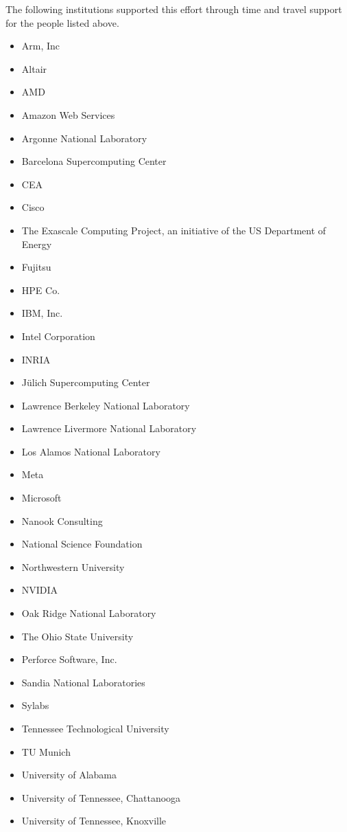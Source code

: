 The following institutions supported this effort through time and travel support for the people listed above.

\begin{itemize}
    \item Arm, Inc
    \item Altair
    \item AMD
    \item Amazon Web Services
    \item Argonne National Laboratory
    \item Barcelona Supercomputing Center
    \item CEA
    \item Cisco
    \item The Exascale Computing Project, an initiative of the US Department of Energy
    \item Fujitsu
    \item HPE Co.
    \item IBM, Inc.
    \item Intel Corporation
    \item INRIA
    \item Jülich Supercomputing Center
    \item Lawrence Berkeley National Laboratory
    \item Lawrence Livermore National Laboratory
    \item Los Alamos National Laboratory
    \item Meta
    \item Microsoft
    \item Nanook Consulting
    \item National Science Foundation
    \item Northwestern University
    \item NVIDIA
    \item Oak Ridge National Laboratory
    \item The Ohio State University
    \item Perforce Software, Inc.
    \item Sandia National Laboratories
    \item Sylabs
    \item Tennessee Technological University
    \item TU Munich
    \item University of Alabama
    \item University of Tennessee, Chattanooga
    \item University of Tennessee, Knoxville
\end{itemize}

